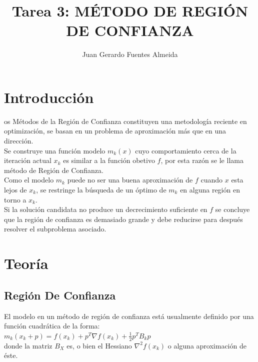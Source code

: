 \documentclass[10pt,journal,compsoc]{styles/IEEEtran}
\title{Tarea 3: M\'ETODO DE REGI\'ON DE CONFIANZA}
\author{Juan Gerardo Fuentes Almeida}
\begin{document}
\maketitle

\IEEEdisplaynontitleabstractindextext

\IEEEpeerreviewmaketitle

\section{Introducci\'on}

os M\'etodos de la Regi\'on de Confianza constituyen una metodolog\'ia reciente en optimizaci\'on, se basan en un problema de aproximaci\'on m\'as que en una direcci\'on.\\

Se construye una funci\'on modelo $m_k(x)$ cuyo comportamiento cerca de la iteraci\'on actual $x_k$ es similar a la funci\'on obetivo $f$, por esta raz\'on se le llama m\'etodo de Regi\'on de Confianza.\\

Como el modelo $m_k$ puede no ser una buena aproximaci\'on de $f$ cuando $x$ esta lejos de $x_k$, se restringe la b\'usqueda de un \'optimo de $m_k$ en alguna regi\'on en torno a $x_k$.\\

Si la soluci\'on candidata no produce un decrecimiento suficiente en $f$ se concluye
que la regi\'on de confianza es demasiado grande y debe reducirse para despu\'es resolver el subproblema asociado.\\


\section{Teor\'ia}

\subsection{Regi\'on  De Confianza }

El modelo en un m\'etodo de regi\'on de confianza est\'a usualmente definido por una
funci\'on cuadr\'atica de la forma:\\

$m_k(x_k+p)=f(x_k)+p^T \nabla f(x_k)+\frac{1}{2}p^T B_k p$\\

donde la matriz $B_X$ es, o bien el Hessiano $\nabla^2f(x_k)$ o alguna aproximaci\'on de
\'este.\\
\end{document}
